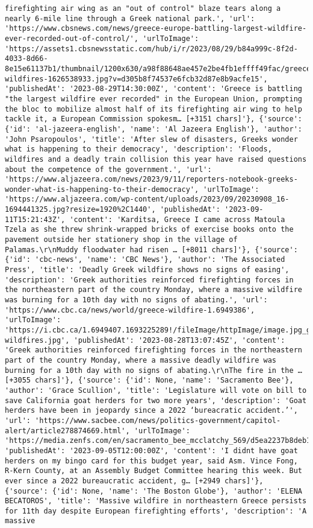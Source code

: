 \documentclass[
  letterpaper,
  DIV=11,
  numbers=noendperiod]{scrartcl}
\begin{document}
\begin{verbatim}
firefighting air wing as an "out of control" blaze tears along a nearly 6-mile line through a Greek national park.', 'url': 'https://www.cbsnews.com/news/greece-europe-battling-largest-wildfire-ever-recorded-out-of-control/', 'urlToImage': 'https://assets1.cbsnewsstatic.com/hub/i/r/2023/08/29/b84a999c-8f2d-4033-8d66-8e15e61137b1/thumbnail/1200x630/a98f88648ae457e2be4fb1effff49fac/greece-wildfires-1626538933.jpg?v=d305b8f74537e6fcb32d87e8b9acfe15', 'publishedAt': '2023-08-29T14:30:00Z', 'content': 'Greece is battling "the largest wildfire ever recorded" in the European Union, prompting the bloc to mobilize almost half of its firefighting air wing to help tackle it, a European Commission spokesm… [+3151 chars]'}, {'source': {'id': 'al-jazeera-english', 'name': 'Al Jazeera English'}, 'author': 'John Psaropoulos', 'title': 'After slew of disasters, Greeks wonder what is happening to their democracy', 'description': 'Floods, wildfires and a deadly train collision this year have raised questions about the competence of the government.', 'url': 'https://www.aljazeera.com/news/2023/9/11/reporters-notebook-greeks-wonder-what-is-happening-to-their-democracy', 'urlToImage': 'https://www.aljazeera.com/wp-content/uploads/2023/09/20230908_16-1694441325.jpg?resize=1920%2C1440', 'publishedAt': '2023-09-11T15:21:43Z', 'content': 'Karditsa, Greece I came across Matoula Tzela as she threw shrink-wrapped bricks of exercise books onto the pavement outside her stationery shop in the village of Palamas.\r\nMuddy floodwater had risen … [+8011 chars]'}, {'source': {'id': 'cbc-news', 'name': 'CBC News'}, 'author': 'The Associated Press', 'title': 'Deadly Greek wildfire shows no signs of easing', 'description': 'Greek authorities reinforced firefighting forces in the northeastern part of the country Monday, where a massive wildfire was burning for a 10th day with no signs of abating.', 'url': 'https://www.cbc.ca/news/world/greece-wildfire-1.6949386', 'urlToImage': 'https://i.cbc.ca/1.6949407.1693225289!/fileImage/httpImage/image.jpg_gen/derivatives/16x9_620/greece-wildfires.jpg', 'publishedAt': '2023-08-28T13:07:45Z', 'content': 'Greek authorities reinforced firefighting forces in the northeastern part of the country Monday, where a massive deadly wildfire was burning for a 10th day with no signs of abating.\r\nThe fire in the … [+3055 chars]'}, {'source': {'id': None, 'name': 'Sacramento Bee'}, 'author': 'Grace Scullion', 'title': 'Legislature will vote on bill to save California goat herders for two more years', 'description': 'Goat herders have been in jeopardy since a 2022 ‘bureacratic accident.’', 'url': 'https://www.sacbee.com/news/politics-government/capitol-alert/article278874669.html', 'urlToImage': 'https://media.zenfs.com/en/sacramento_bee_mcclatchy_569/d5ea2237b8deb1b9baef3f5350903f3c', 'publishedAt': '2023-09-05T12:00:00Z', 'content': 'I didnt have goat herders on my bingo card for this budget year, said Asm. Vince Fong, R-Kern County, at an Assembly Budget Committee hearing this week. But ever since a 2022 bureaucratic accident, g… [+2949 chars]'}, {'source': {'id': None, 'name': 'The Boston Globe'}, 'author': 'ELENA BECATOROS', 'title': 'Massive wildfire in northeastern Greece persists for 11th day despite European firefighting efforts', 'description': 'A massive 
\end{verbatim}
\end{document}
